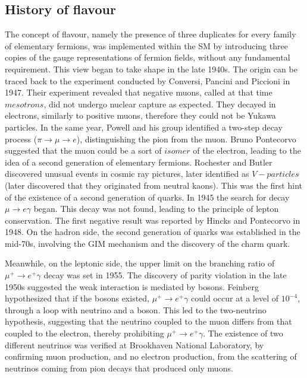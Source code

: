 \subsection{History of flavour}
The concept of flavour, namely the presence of three 
duplicates for every family of elementary fermions, was implemented within the SM by introducing 
three copies of the gauge representations of fermion fields, without any fundamental requirement. This view began 
to take shape in the late 1940s. The origin can be traced back to the 
experiment conducted by Conversi, Pancini and Piccioni in 1947. Their experiment 
revealed that negative muons, called at that time $mesotrons$, did not 
undergo nuclear capture as expected. They decayed in electrons, similarly to positive muons, 
therefore they could not be Yukawa particles. In the same year, 
Powell and his group identified a two-step decay process ($\pi \rightarrow \mu \rightarrow e$), 
distinguishing the pion from the muon. Bruno Pontecorvo suggested 
that the muon could be a sort of $isomer$ of the electron, leading to the idea of a second 
generation of elementary fermions. Rochester and Butler discovered 
unusual events in cosmic ray pictures, later identified as 
$V-particles$ (later discovered that they originated from neutral kaons). This was 
the first hint of the existence of a second generation of quarks. 
In 1945 the search for decay $\mu \rightarrow e \gamma$ began. This decay was not found, 
leading to the principle of lepton conservation. The first negative 
result was reported by Hincks and Pontecorvo in 1948. 
On the hadron side, the second generation of quarks was established in the mid-70s, 
involving the GIM mechanism and the discovery of the charm quark.

Meanwhile, on the leptonic side, the upper limit on the 
branching ratio of $\mu^+ \rightarrow  e^+ \gamma$ decay was set in 1955.
The discovery of parity violation 
in the late 1950s suggested the weak interaction is 
mediated by bosons. Feinberg hypothesized that if the bosons existed, 
$\mu^+ \rightarrow  e^+ \gamma$ could occur 
at a level of $10^{-4}$, through a 
loop with neutrino and a boson. This led to the two-neutrino hypothesis, suggesting that 
the neutrino coupled to the muon differs from that coupled to 
the electron, thereby prohibiting $\mu^+ \rightarrow  e^+ \gamma$. The existence of 
two different neutrinos was verified at Brookhaven National Laboratory, by
confirming muon production, and no electron production, from the scattering of neutrinos
coming from pion decays that produced only muons.

